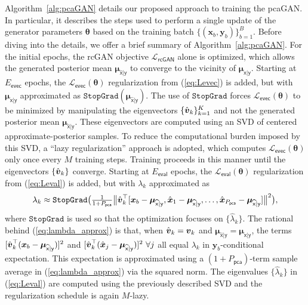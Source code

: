 \documentclass{article}
\theoremstyle{plain}
\theoremstyle{definition}
\theoremstyle{remark}
\renewcommand{\hat}{\widehat}
\newcommand{\hvec}[1]{\ensuremath{\Hat{\boldsymbol{#1}}}}
\renewcommand{\vec}[1]{\ensuremath{\boldsymbol{#1}}}
\newcommand{\mc}[1]{\ensuremath{\mathcal{#1}}}
\newcommand{\tran}{^{\top}}
\newcommand{\Algref}[1]{Algorithm~\ref{alg:#1}}
\renewcommand{\eqref}[1]{(\ref{eq:#1})}
\newcommand{\eig}{_{\mathsf{pca}}}
\newcommand{\eval}{_{\mathsf{eval}}}
\newcommand{\evec}{_{\mathsf{evec}}}
\newcommand{\Lrcgan}{\mc{L}_{\mathsf{rcGAN}}}
\newcommand{\muxgy}{\vec{\mu}_{\mathsf{x}|\mathsf{y}}}
\newcommand{\muxgyhat}{\vec{\mu}_{\hat{\mathsf{x}}|\mathsf{y}}}
\newcommand{\sg}{\texttt{StopGrad}}
\begin{document}
\Algref{pcaGAN} details our proposed approach to training the pcaGAN. 
In particular, it describes the steps used to perform a single update of the generator parameters $\vec{\theta}$ based on the training batch $\{(\vec{x}_b, \vec{y}_b)\}_{b=1}^B$.
Before diving into the details, we offer a brief summary of \Algref{pcaGAN}.
For the initial epochs, the rcGAN objective $\Lrcgan$ alone is optimized, which allows the generated posterior mean $\muxgyhat$ to converge to the vicinity of $\muxgy$.
Starting at $E\evec$ epochs, the $\mc{L}\evec(\vec{\theta})$ regularization from \eqref{Levec} is added, but with $\muxgy$ approximated as $\sg(\muxgyhat)$.
The use of $\sg$ forces $\mc{L}\evec(\vec{\theta})$ to be minimized by manipulating the eigenvectors $\{\hvec{v}_k\}_{k=1}^K$ and not the generated posterior mean $\muxgyhat$.
These eigenvectors are computed using an SVD of centered approximate-posterior samples.
To reduce the computational burden imposed by this SVD, a ``lazy regularization'' \cite{Karras:CVPR:20} approach is adopted, which computes $\mc{L}\evec(\vec{\theta})$ only once every $M$ training steps.
Training proceeds in this manner until the eigenvectors $\{\hvec{v}_k\}$ converge.
Starting at $E\eval$ epochs, the $\mc{L}\eval(\vec{\theta})$ regularization from \eqref{Leval} is added, but with %
$\lambda_k$ approximated as
\begin{align}
\lambda_k \approx \sg\big(\tfrac{1}{1+P\eig}\big\|\hvec{v}_k\tran[\vec{x}_b-\muxgyhat,\hvec{x}_1-\muxgyhat,\dots,\hvec{x}_{P\eig}-\muxgyhat]\big\|^2\big),
\label{eq:lambda_approx}
\end{align}
where $\sg$ is used so that the optimization focuses on $\{\hat{\lambda}_k\}$.
The rational behind \eqref{lambda_approx} is that, when $\hvec{v}_k=\vec{v}_k$ and $\muxgyhat=\muxgy$, the terms $[\hvec{v}_k\tran(\vec{x}_b-\muxgyhat)]^2$ and $[\hvec{v}_k\tran(\hvec{x}_j-\muxgyhat)]^2~\forall j$ all equal $\lambda_k$ in $\vec{y}_b$-conditional expectation.
This expectation is approximated using a $(1+P\eig)$-term sample average in \eqref{lambda_approx} via the squared norm.
The eigenvalues $\{\hat{\lambda}_k\}$ in \eqref{Leval} are computed using the previously described SVD and the regularization schedule is again $M$-lazy.
\end{document}
